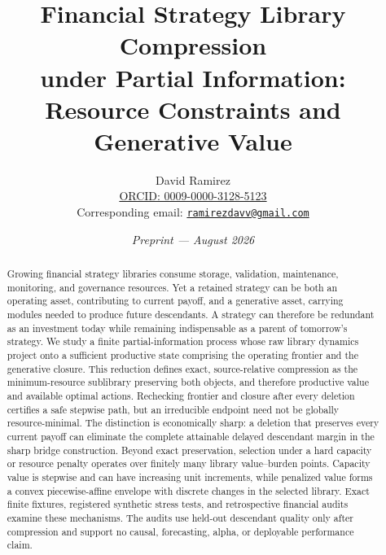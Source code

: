 \documentclass[11pt]{article}
\title{Financial Strategy Library Compression\\
under Partial Information:\\
Resource Constraints and Generative Value}
\author{David Ramirez\\
\href{https://orcid.org/0009-0000-3128-5123}{ORCID: 0009-0000-3128-5123}\\
Corresponding email: \href{mailto:ramirezdavv@gmail.com}{\texttt{ramirezdavv@gmail.com}}}
\date{\textit{Preprint --- August 2026}}
\numberwithin{equation}{section}
\theoremstyle{definition}
\theoremstyle{plain}
\begin{document}
\maketitle

\begin{abstract}
Growing financial strategy libraries consume storage, validation, maintenance,
monitoring, and governance resources. Yet a retained strategy can be both an
operating asset, contributing to current payoff, and a generative asset,
carrying modules needed to produce future descendants. A strategy can
therefore be redundant as an investment today while remaining indispensable
as a parent of tomorrow's strategy. We study a finite partial-information
process whose raw library dynamics project onto a
sufficient productive state comprising the operating frontier and the
generative closure. This reduction defines exact, source-relative compression
as the
minimum-resource sublibrary preserving both objects, and therefore productive
value and available optimal actions. Rechecking frontier and closure after
every deletion certifies a safe stepwise path, but an irreducible endpoint need
not be globally resource-minimal. The distinction is economically sharp: a
deletion that preserves every current payoff can eliminate the complete
attainable delayed descendant margin in the sharp bridge construction. Beyond
exact preservation, selection under a hard capacity or resource penalty
operates over finitely many library value--burden points. Capacity value is
stepwise and
can have increasing unit increments, while penalized value forms a convex
piecewise-affine envelope with discrete changes in the selected library. Exact
finite fixtures, registered synthetic stress tests, and retrospective
financial audits examine these mechanisms. The audits use held-out descendant
quality only after compression and support no causal, forecasting, alpha, or
deployable performance claim.
\end{abstract}












\end{document}
